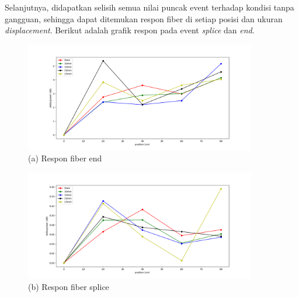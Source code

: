 \documentclass[12pt]{article}
\begin{document}
	Selanjutnya, didapatkan selisih semua nilai puncak event terhadap kondisi tanpa gangguan,
	sehingga dapat ditemukan respon fiber di setiap posisi dan ukuran \textit{displacement}.
	Berikut adalah grafik respon pada event \textit{splice} dan \textit{end}.
	
	\begin{figure}[!h]
		\centering
		\captionsetup{justification=centering}
		\includegraphics[width=0.9\textwidth]{images/Bab_4/Bab_4_5f1}	
		\caption{\small{(a) Respon fiber end}}
	\end{figure}
	
	\begin{figure}[!h]
		\centering
		\captionsetup{justification=centering}
		\includegraphics[width=0.9\textwidth]{images/Bab_4/Bab_4_5f2}	
		\caption{\small{(b) Respon fiber splice}}
	\end{figure}
	
\end{document}
